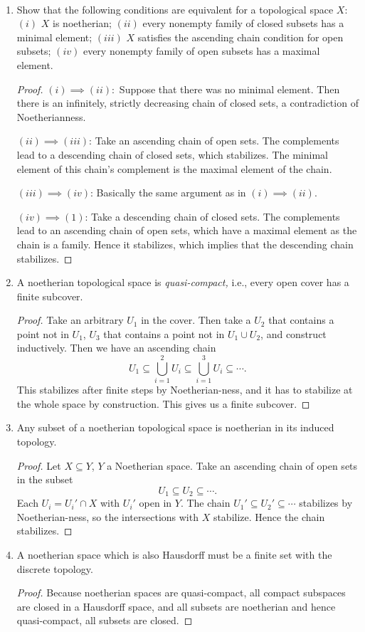 \documentclass[openany, amssymb, psamsfonts]{amsart}
\begin{document}
\begin{exercise}%
~
\begin{enumerate}
\item Show that the following conditions are equivalent for a topological space $X$: $(i)$ $X$ is noetherian; $(ii)$ every nonempty family of closed subsets has a minimal element; $(iii)$ $X$ satisfies the ascending chain condition for open subsets; $(iv)$ every nonempty family of open subsets has a maximal element.
\begin{proof}
	$(i)\implies (ii):$ Suppose that there was no minimal element.
	Then there is an infinitely, strictly decreasing chain of closed sets, a contradiction of Noetherianness.

	$(ii) \implies (iii) $: Take an ascending chain of open sets.
	The complements lead to a descending chain of closed sets, which stabilizes.
	The minimal element of this chain's complement is the maximal element of the chain.

	$(iii)\implies (iv) $: Basically the same argument as in $(i)\implies (ii) $.

	$(iv)\implies (1) $: Take a descending chain of closed sets.
	The complements lead to an ascending chain of open sets, which have a maximal element as the chain is a family.
	Hence it stabilizes, which implies that the descending chain stabilizes.
\end{proof}
\item A noetherian topological space is \emph{quasi-compact,} i.e., every open cover has a finite subcover.
\begin{proof}
	Take an arbitrary $U_{1} $ in the cover.
	Then take a $U_{2} $ that contains a point not in $U_{1} $, $U_{3} $ that contains a point not in $U_{1}\cup U_{2} $, and construct inductively.
	Then we have an ascending chain
	\[
		U_{1} \subseteq \bigcup_{i=1}^2 U_i \subseteq \bigcup_{i=1}^3 U_i \subseteq \cdots
	.\] 
	This stabilizes after finite steps by Noetherian-ness, and it has to stabilize at the whole space by construction.
	This gives us a finite subcover.
\end{proof}
\item Any subset of a noetherian topological space is noetherian in its induced topology.
\begin{proof}
	Let $X\subseteq Y $, $Y $ a Noetherian space.
	Take an ascending chain of open sets in the subset
	\[
		U_{1} \subseteq U_{2} \subseteq \cdots
	.\]
	Each $U_{i} = U_i' \cap X$ with $U_i' $ open in $Y $.
	The chain $U_{1}' \subseteq U_{2}' \subseteq \cdots $ stabilizes by Noetherian-ness, so the intersections with $X $ stabilize.
	Hence the chain stabilizes.
\end{proof}
\item A noetherian space which is also Hausdorff must be a finite set with the discrete topology.    
\begin{proof}
	Because noetherian spaces are quasi-compact, all compact subspaces are closed in a Hausdorff space, and all subsets are noetherian and hence quasi-compact, all subsets are closed.
\end{proof}
\end{enumerate}
\end{exercise}
\end{document}
